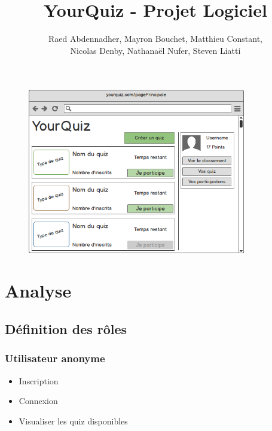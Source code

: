 \documentclass[a4paper, 12pt]{article}
\begin{document}
\title{YourQuiz - Projet Logiciel}
\author{Raed Abdennadher, Mayron Bouchet, Matthieu Constant, \\ Nicolas Denby, Nathanaël Nufer, Steven Liatti}
\maketitle

\begin{figure}
	\begin{center}
		\includegraphics[width=0.85\textwidth]{../mockups/png/mainPage.png}
	\end{center}
\end{figure}
\newpage

\tableofcontents
\listoffigures

\newpage

\section{Analyse}
\subsection{Définition des rôles}
\subsubsection{Utilisateur anonyme}
\begin{itemize}
    \item Inscription
    \item Connexion
    \item Visualiser les quiz disponibles
\end{itemize}
\end{document}
